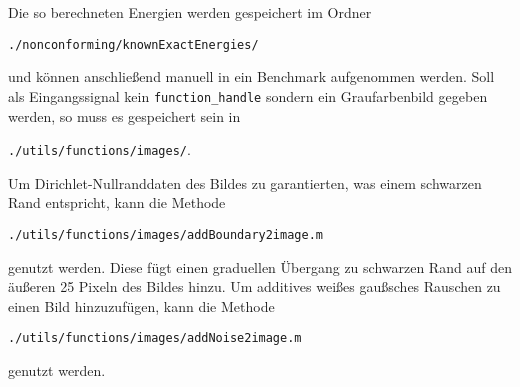 Die so berechneten Energien werden gespeichert im Ordner
\begin{center}
  \texttt{./nonconforming/knownExactEnergies/}
\end{center}
und können anschließend manuell in ein Benchmark aufgenommen werden.
Soll als Eingangssignal kein \texttt{function\_handle} sondern ein
Graufarbenbild gegeben werden, so muss es gespeichert sein in 
\begin{center}
  \texttt{./utils/functions/images/}.
\end{center}
Um Dirichlet-Nullranddaten des Bildes zu garantierten, was einem schwarzen Rand
entspricht, kann die Methode 
\begin{center}
  \texttt{./utils/functions/images/addBoundary2image.m}
\end{center}
genutzt werden. Diese fügt einen graduellen Übergang zu schwarzen Rand auf den 
äußeren 25 Pixeln des Bildes hinzu.
Um additives weißes gaußsches Rauschen zu einen Bild hinzuzufügen, kann die
Methode
\begin{center}
  \texttt{./utils/functions/images/addNoise2image.m}
\end{center}
genutzt werden. 

